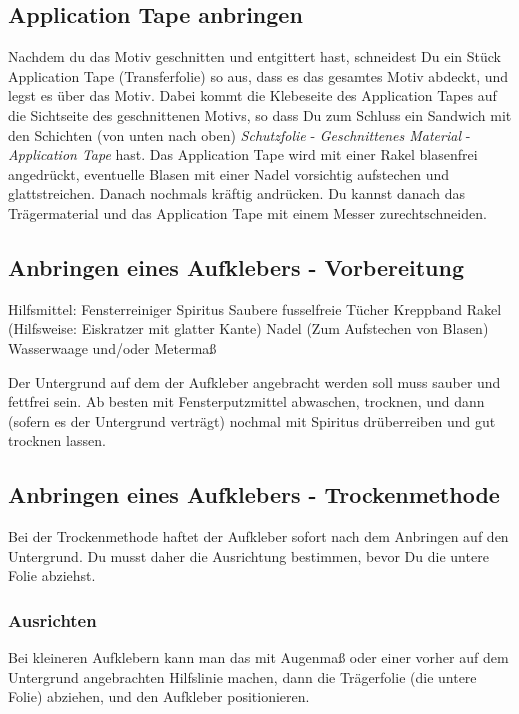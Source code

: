 \documentclass{\basedir/fablab-document}
\begin{document}
\subsection{Application Tape anbringen}
Nachdem du das Motiv geschnitten und entgittert hast, schneidest Du ein Stück Application Tape (Transferfolie) so aus, dass es das gesamtes Motiv abdeckt, und legst es über das Motiv.
Dabei kommt die Klebeseite des Application Tapes auf die Sichtseite des geschnittenen Motivs, so dass Du zum Schluss ein Sandwich mit den Schichten (von unten nach oben) \textit{Schutzfolie} - \textit{Geschnittenes Material} - \textit{Application Tape} hast.
Das Application Tape wird mit einer Rakel blasenfrei angedrückt, eventuelle Blasen mit einer Nadel vorsichtig aufstechen und glattstreichen.
Danach nochmals kräftig andrücken.
Du kannst danach das Trägermaterial und das Application Tape mit einem Messer zurechtschneiden.

\subsection{Anbringen eines Aufklebers - Vorbereitung}
Hilfsmittel:
\textbullet Fensterreiniger
\textbullet Spiritus
\textbullet Saubere fusselfreie Tücher
\textbullet Kreppband
\textbullet Rakel (Hilfsweise: Eiskratzer mit glatter Kante)
\textbullet Nadel (Zum Aufstechen von Blasen)
\textbullet Wasserwaage und/oder Metermaß

Der Untergrund auf dem der Aufkleber angebracht werden soll muss sauber und fettfrei sein.
Ab besten mit Fensterputzmittel abwaschen, trocknen, und dann (sofern es der Untergrund verträgt) nochmal mit Spiritus drüberreiben und gut trocknen lassen.

\subsection{Anbringen eines Aufklebers - Trockenmethode}
Bei der Trockenmethode haftet der Aufkleber sofort nach dem Anbringen auf den Untergrund.
Du musst daher die Ausrichtung bestimmen, bevor Du die untere Folie abziehst.

\subsubsection{Ausrichten}
Bei kleineren Aufklebern kann man das mit Augenmaß oder einer vorher auf dem Untergrund angebrachten Hilfslinie machen, dann die Trägerfolie (die untere Folie) abziehen, und den Aufkleber positionieren. 
\end{document}
